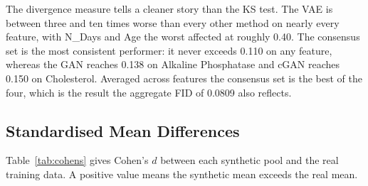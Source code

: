 \documentclass[journal,onecolumn]{IEEEtran}
\begin{document}
The divergence measure tells a cleaner story than the KS test. The VAE is between three and ten times worse than every other method on nearly every feature, with N\_Days and Age the worst affected at roughly 0.40. The consensus set is the most consistent performer: it never exceeds 0.110 on any feature, whereas the GAN reaches 0.138 on Alkaline Phosphatase and cGAN reaches 0.150 on Cholesterol. Averaged across features the consensus set is the best of the four, which is the result the aggregate FID of 0.0809 also reflects.

\subsection{Standardised Mean Differences}

Table~\ref{tab:cohens} gives Cohen's $d$ between each synthetic pool and the real training data. A positive value means the synthetic mean exceeds the real mean.

\begin{table}[!t]
  \centering
  \caption{Cohen's $d$ Between Synthetic and Real Training Data. Values Near Zero Indicate Well-Matched Means}
  \label{tab:cohens}
\end{table}
\end{document}

